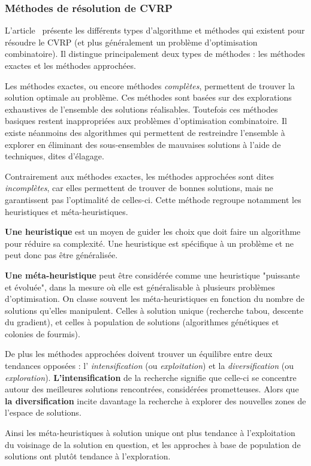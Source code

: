\documentclass[a4paper,11pt]{article}%
\begin{document}
\subsubsection{Méthodes de résolution de CVRP}
L'article~\cite{synthese} présente les différents types d'algorithme et méthodes qui existent pour résoudre le CVRP (et plus généralement un problème d'optimisation combinatoire).
Il distingue principalement deux types de méthodes : les méthodes exactes et les méthodes approchées.

Les méthodes exactes, ou encore méthodes \emph{complètes}, permettent de trouver la solution optimale au problème. 
Ces méthodes sont basées sur des explorations exhaustives de l'ensemble des solutions réalisables. 
Toutefois ces méthodes basiques restent inappropriées aux problèmes d'optimisation combinatoire. 
Il existe néanmoins des algorithmes qui permettent de restreindre l'ensemble à explorer en éliminant des sous-ensembles de mauvaises solutions à l'aide de techniques, dites d'élagage.

Contrairement aux méthodes exactes, les méthodes approchées sont dites \emph{incomplètes}, car elles permettent de trouver de bonnes solutions, mais ne garantissent pas l'optimalité de celles-ci. 
Cette méthode regroupe notamment les heuristiques et méta-heuristiques.

\textbf{Une heuristique} est un moyen de guider les choix que doit faire un algorithme pour réduire sa complexité. Une heuristique est spécifique à un problème et ne peut donc pas être généralisée.

\textbf{Une méta-heuristique} peut être considérée comme une heuristique "puissante et évoluée", dans la mesure où elle est généralisable à plusieurs problèmes d'optimisation. On classe souvent les méta-heuristiques en fonction du nombre de solutions qu'elles manipulent. Celles à solution unique (recherche tabou, descente du gradient), et celles à population de solutions (algorithmes génétiques et colonies de fourmis).

De plus les méthodes approchées doivent trouver un équilibre entre deux tendances opposées : l' \emph{intensification} (ou \emph{exploitation}) et la \emph{diversification} (ou \emph{exploration}). \textbf{L'intensification} de la recherche signifie que celle-ci se concentre autour des meilleures solutions rencontrées, considérées prometteuses. 
Alors que \textbf{la diversification} incite davantage la recherche à explorer des nouvelles zones de l'espace de solutions. 

Ainsi les méta-heuristiques à solution unique ont plus tendance à l'exploitation du voisinage de la solution en question, et les approches à base de population de
solutions ont plutôt tendance à l'exploration.
\end{document}
